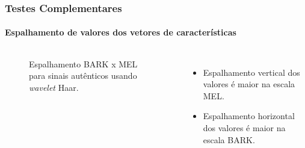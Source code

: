 \begin{frame}
	\frametitle{Testes Complementares}
		\framesubtitle{Espalhamento de valores dos vetores de características}

		\begin{columns}
			\begin{figure}
				\centering
				\caption{Espalhamento BARK x MEL para sinais autênticos usando \textit{wavelet} Haar.}
				\label{fig:barkversusmelonhaar}
			\end{figure}
			\begin{itemize}
				\item Espalhamento vertical dos valores é maior na escala MEL.
				\item Espalhamento horizontal dos valores é maior na escala BARK.
			\end{itemize}
		\end{columns}		
	
\end{frame}